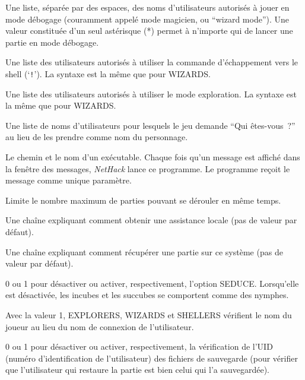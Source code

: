 \documentclass[titlepage]{article}
\begin{document}
\begin{description}[font=\mdseries\itshape]
\item[WIZARDS]
Une liste, séparée par des espaces, des noms d'utilisateurs autorisés à
jouer en mode débogage (couramment appelé mode magicien, ou ``wizard mode'').
Une valeur constituée d'un seul
astérisque (*) permet à n'importe qui de lancer une partie en mode débogage.
\item[SHELLERS]
Une liste des utilisateurs autorisés à utiliser la commande d'échappement vers le shell (`\texttt{!}').
La syntaxe est la même que pour WIZARDS.
\item[EXPLORERS]
Une liste des utilisateurs autorisés à utiliser le mode exploration.
La syntaxe est la même que pour WIZARDS.
\item[GENERICUSERS]
Une liste de noms d'utilisateurs pour lesquels le jeu demande ``Qui êtes-vous~?''
au lieu de les prendre comme nom du personnage.
\item[MSGHANDLER]
Le chemin et le nom d'un exécutable.  Chaque fois qu'un message
est affiché dans la fenêtre des messages, \textit{NetHack} lance ce programme.  Le programme
reçoit le message comme unique paramètre.
\item[MAXPLAYERS]
Limite le nombre maximum de parties pouvant se dérouler en même temps.
\item[SUPPORT]
Une chaîne expliquant comment obtenir une assistance locale (pas de valeur par défaut).
\item[RECOVER]
Une chaîne expliquant comment récupérer une partie sur ce système (pas de valeur par défaut).
\item[SEDUCE]
0 ou 1 pour désactiver ou activer, respectivement, l'option SEDUCE.
Lorsqu'elle est désactivée, les incubes et les succubes se comportent comme des nymphes.
\item[CHECK\textunderscore PLNAME]
Avec la valeur 1, EXPLORERS, WIZARDS et SHELLERS vérifient
le nom du joueur au lieu du nom de connexion de l'utilisateur.
\item[CHECK\textunderscore SAVE\textunderscore UID]
0 ou 1 pour désactiver ou activer, respectivement, la vérification
de l'UID (numéro d'identification de l'utilisateur) des fichiers de sauvegarde (pour
vérifier que l'utilisateur qui restaure la partie est bien celui qui l'a sauvegardée).
\end{description}
\end{document}
